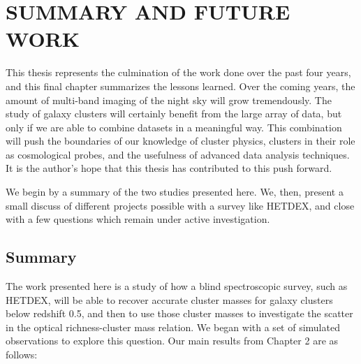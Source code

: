 %
%
%



\chapter[\uppercase{Summary and Future Work}]{\uppercase{Summary and Future Work}}

This thesis represents the culmination of the work done over the past four years, and this final chapter summarizes the lessons learned. Over the coming years, the amount of multi-band imaging of the night sky will grow tremendously. The study of galaxy clusters will certainly benefit from the large array of data, but only if we are able to combine datasets in a meaningful way. This combination will push the boundaries of our knowledge of cluster physics, clusters in their role as cosmological probes, and the usefulness of advanced data analysis techniques. It is the author's hope that this thesis has contributed to this push forward. 

We begin by a summary of the two studies presented here. We, then, present a small discuss of different projects possible with a survey like HETDEX, and close with a few questions which remain under active investigation.

\section{Summary} 
The work presented here is a study of how a blind spectroscopic survey, such as HETDEX, will be able to recover accurate cluster masses for galaxy clusters below redshift 0.5, and then to use those cluster masses to investigate the scatter in the optical richness-cluster mass relation. We began with a set of simulated observations to explore this question. Our main results from Chapter 2 are as follows:

